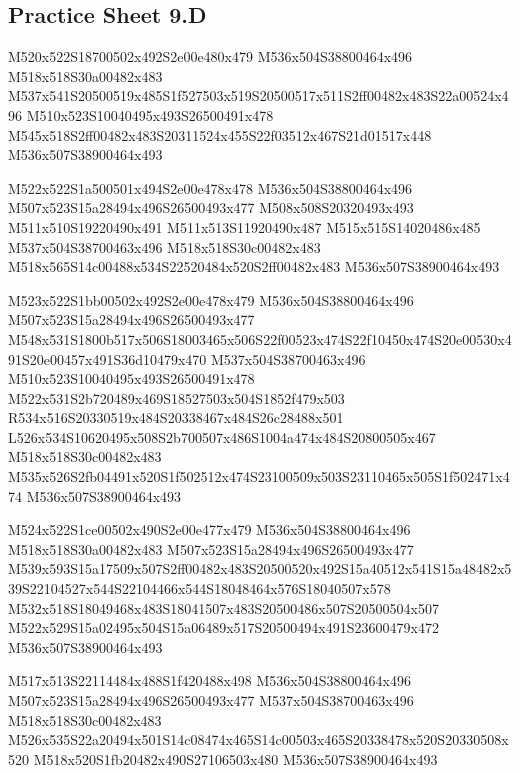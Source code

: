 \documentclass{article}
\begin{document}
\subsection{Practice Sheet 9.D}

\begin{multicols}{5}
\begin{center}

M520x522S18700502x492S2e00e480x479 %
M536x504S38800464x496 %
M518x518S30a00482x483 %
M537x541S20500519x485S1f527503x519S20500517x511S2ff00482x483S22a00524x496 %
M510x523S10040495x493S26500491x478 %
M545x518S2ff00482x483S20311524x455S22f03512x467S21d01517x448 %
M536x507S38900464x493 %
\vfil
\columnbreak

M522x522S1a500501x494S2e00e478x478 %
M536x504S38800464x496 %
M507x523S15a28494x496S26500493x477 %
M508x508S20320493x493 %
M511x510S19220490x491 %
M511x513S11920490x487 %
M515x515S14020486x485 %
M537x504S38700463x496 %
M518x518S30c00482x483 %
M518x565S14c00488x534S22520484x520S2ff00482x483 %
M536x507S38900464x493 %
\vfil
\columnbreak

M523x522S1bb00502x492S2e00e478x479 %
M536x504S38800464x496 %
M507x523S15a28494x496S26500493x477 %
M548x531S1800b517x506S18003465x506S22f00523x474S22f10450x474S20e00530x491S20e00457x491S36d10479x470 %
M537x504S38700463x496 %
M510x523S10040495x493S26500491x478 %
M522x531S2b720489x469S18527503x504S1852f479x503 %
R534x516S20330519x484S20338467x484S26c28488x501 %
L526x534S10620495x508S2b700507x486S1004a474x484S20800505x467 %
M518x518S30c00482x483 %
M535x526S2fb04491x520S1f502512x474S23100509x503S23110465x505S1f502471x474 %
M536x507S38900464x493 %
\vfil
\columnbreak

M524x522S1ce00502x490S2e00e477x479 %
M536x504S38800464x496 %
M518x518S30a00482x483 %
M507x523S15a28494x496S26500493x477 %
M539x593S15a17509x507S2ff00482x483S20500520x492S15a40512x541S15a48482x539S22104527x544S22104466x544S18048464x576S18040507x578 %
M532x518S18049468x483S18041507x483S20500486x507S20500504x507 %
M522x529S15a02495x504S15a06489x517S20500494x491S23600479x472 %
M536x507S38900464x493 %
\vfil
\columnbreak

M517x513S22114484x488S1f420488x498 %
M536x504S38800464x496 %
M507x523S15a28494x496S26500493x477 %
M537x504S38700463x496 %
M518x518S30c00482x483 %
M526x535S22a20494x501S14c08474x465S14c00503x465S20338478x520S20330508x520 %
M518x520S1fb20482x490S27106503x480 %
M536x507S38900464x493 %
\vfil

\end{center}
\end{multicols}
\end{document}
